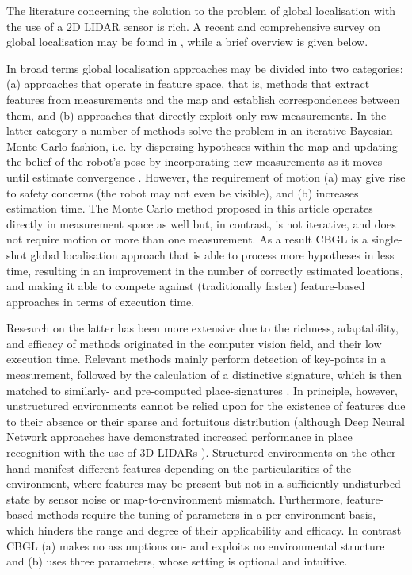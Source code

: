 The literature concerning the solution to the problem of global localisation
with the use of a 2D LIDAR sensor is rich. A recent and comprehensive survey on
global localisation may be found in \cite{gl_survey_cn}, while a brief overview
is given below.

In broad terms global localisation approaches may be divided into two
categories: (a) approaches that operate in feature space, that is, methods that
extract features from measurements and the map and establish correspondences
between them, and (b) approaches that directly exploit only raw measurements.
In the latter category a number of methods solve the problem in an iterative
Bayesian Monte Carlo fashion, i.e. by dispersing hypotheses within the map and
updating the belief of the robot's pose by incorporating new measurements as it
moves until estimate convergence
\cite{mcl,Wang2018d,Yilmaz2019a,gmcl,Chen2021a}. However, the requirement of
motion (a) may give rise to safety concerns (the robot may not even be
visible), and (b) increases estimation time. The Monte Carlo method proposed in
this article operates directly in measurement space as well but, in contrast,
is not iterative, and does not require motion or more than one measurement. As
a result CBGL is a single-shot global localisation approach that is able to
process more hypotheses in less time, resulting in an improvement in the number
of correctly estimated locations, and making it able to compete against
(traditionally faster) feature-based approaches in terms of execution time.

Research on the latter has been more extensive due to the richness,
adaptability, and efficacy of methods originated in the computer vision field,
and their low execution time. Relevant methods mainly perform detection of
key-points in a measurement, followed by the calculation of a distinctive
signature, which is then matched to similarly- and pre-computed
place-signatures
\cite{Kallasi2016a,als_eth,Usman2019,Wang2021b,Meng2021,Hendrikx2021,An2022,Nielsen2023}.
In principle, however, unstructured environments cannot be relied upon for the
existence of features due to their absence or their sparse and fortuitous
distribution (although Deep Neural Network approaches have demonstrated
increased performance in place recognition with the use of 3D LIDARs
\cite{Xu2021,Yin2022,Komorowski2022}). Structured environments on the other
hand manifest different features depending on the particularities of the
environment, where features may be present but not in a sufficiently
undisturbed state by sensor noise or map-to-environment mismatch. Furthermore,
feature-based methods require the tuning of parameters in a per-environment
basis, which hinders the range and degree of their applicability and efficacy.
In contrast CBGL (a) makes no assumptions on- and exploits no environmental
structure and (b) uses three parameters, whose setting is optional and
intuitive.

